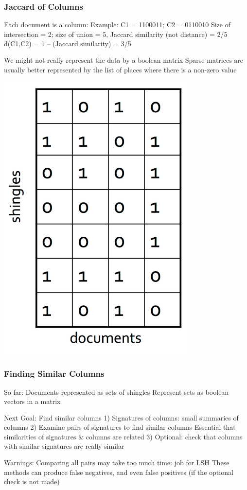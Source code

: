 \documentclass[svgnames]{beamer}
\begin{document}
  
\begin{frame} \frametitle{Jaccard of Columns}

Each document is a column:
  Example: C1 = 1100011; C2 = 0110010
  Size of intersection = 2; size of union = 5, Jaccard similarity (not distance) = 2/5
  d(C1,C2) = 1 – (Jaccard similarity) = 3/5

We might not really represent the data by a boolean matrix
  Sparse matrices are usually better represented by the list of places where there is a non-zero value
  
\includegraphics[width=10cm]{matrix}

\end{frame}

  
\begin{frame} \frametitle{Finding Similar Columns}

So far:
  Documents represented as sets of shingles
  Represent sets as boolean vectors in a matrix

Next Goal: Find similar columns
 1) Signatures of columns: small summaries of columns
 2) Examine pairs of signatures to find similar columns 
       Essential that similarities of signatures & columns are related
 3) Optional: check that columns with similar signatures are really similar

Warnings:
  Comparing all pairs may take too much time: job for LSH
  These methods can produce false negatives, and even false positives (if the optional check is not made)
  
\end{frame}
\end{document}

